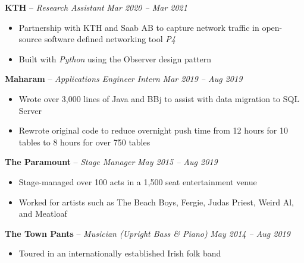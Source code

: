 \documentclass[10pt,letterpaper]{article}
\begin{document}

\headedsection
{\textbf{KTH} -- \textit{Research Assistant}}
{\textit{Mar 2020 -- Mar 2021}} {
	\begin{itemize}[noitemsep,nolistsep]
		\item Partnership with KTH and Saab AB to capture network traffic in open-source software defined networking tool \textit{P4}
		\item Built with \textit{Python} using the Observer design pattern
	\end{itemize}
}
\vspace{-1mm}

\headedsection
{\textbf{Maharam} -- \textit{Applications Engineer Intern}}
{\textit{Mar 2019 -- Aug 2019}} {
	\begin{itemize}[noitemsep,nolistsep]
		\item Wrote over 3,000 lines of Java and BBj to assist with data migration to SQL Server
		\item Rewrote original code to reduce overnight push time from 12 hours for 10 tables to 8 hours for over 750 tables
	\end{itemize}
}
\vspace{-1mm}


\headedsection
{\textbf{The Paramount} -- \textit{Stage Manager}}
{\textit{May 2015 -- Aug 2019}} {
	\begin{itemize}[noitemsep,nolistsep]
		\item Stage-managed over 100 acts in a 1,500 seat entertainment venue
		\item Worked for artists such as The Beach Boys, Fergie, Judas Priest, Weird Al, and Meatloaf
	\end{itemize}
}
\vspace{-1mm}


\headedsection
{\textbf{The Town Pants} -- \textit{Musician (Upright Bass \& Piano)}}
{\textit{May 2014 -- Aug 2019}} {
	\begin{itemize}[noitemsep,nolistsep]
		\item Toured in an internationally established Irish folk band
	\end{itemize}
}
\end{document}
